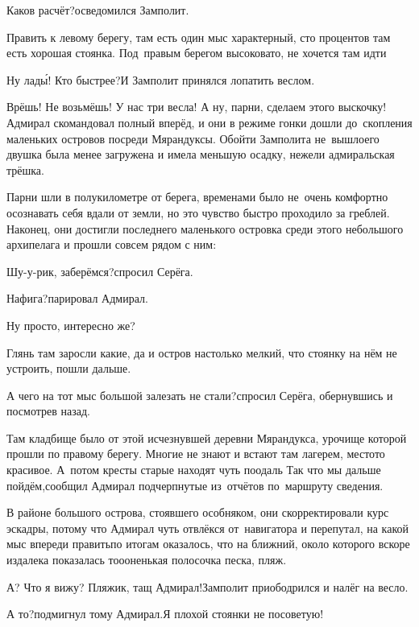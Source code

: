 \diagdash Каков расчёт?\mdash осведомился Замполит.

\diagdash Править к левому берегу, там есть один мыс характерный, сто процентов там есть хорошая стоянка. Под~правым берегом высоковато, не хочется там идти\myldots{}

\diagdash Ну лад\'{ы}! Кто быстрее?\mdash И Замполит принялся лопатить веслом.

\diagdash Врёшь! Не возьмёшь! У нас три весла! А ну, парни, сделаем этого выскочку!\mdash Адмирал скомандовал полный вперёд, и они в режиме гонки дошли до~скопления маленьких островов посреди Мярандуксы. Обойти Замполита не~вышло\mdash его двушка была менее загружена и имела меньшую осадку, нежели адмиральская трёшка. 

Парни шли в полукилометре от берега, временами было не~очень комфортно осознавать себя вдали от земли, но это чувство быстро проходило за греблей. Наконец, они достигли последнего маленького островка среди этого небольшого архипелага и прошли совсем рядом с ним:

\diagdash Шу-у-рик, заберёмся?\mdash спросил Серёга.

\diagdash Нафига?\mdash парировал Адмирал.

\diagdash Ну просто, интересно же?

\diagdash Глянь там заросли какие, да и остров настолько мелкий, что стоянку на нём не устроить, пошли дальше.

\diagdash А чего на тот мыс большой залезать не стали?\mdash спросил Серёга, обернувшись и посмотрев назад.

\diagdash Там кладбище было от этой исчезнувшей деревни Мярандукса, урочище которой прошли по правому берегу. Многие не знают и встают там лагерем, место\sdash то красивое. А~потом кресты старые находят чуть поодаль\myldots{} Так что мы дальше пойдём,\mdash сообщил Адмирал подчерпнутые из~отчётов по~маршруту сведения.

В районе большого острова, стоявшего особняком, они скорректировали курс эскадры, потому что Адмирал чуть отвлёкся от~навигатора и перепутал, на какой мыс впереди править\mdash по итогам оказалось, что на ближний, около которого вскоре издалека показалась то\sdash о\sdash оненькая полосочка песка, пляж.

\diagdash А? Что я вижу? Пляжик, тащ Адмирал!\mdash Замполит приободрился и налёг на весло.

\diagdash А то?\mdash подмигнул тому Адмирал.\mdash Я плохой стоянки не посоветую!

